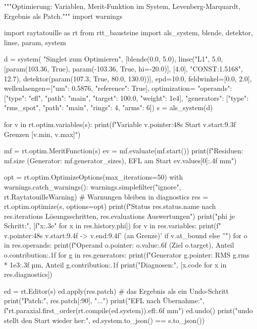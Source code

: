 \documentclass[11pt,a4paper,openany]{book}
\DeclareRobustCommand{\code}[1]{\texttt{\directlua{rttcode("\luaescapestring{\detokenize{#1}}")}}}
\begin{document}
\begin{pycode}[title={\code{ex13_optimierung.py}}]
"""Optimierung: Variablen, Merit-Funktion im System, Levenberg-Marquardt, Ergebnis als Patch."""
import warnings

import raytatouille as rt
from rtt_bausteine import als_system, blende, detektor, linse, param, system

d = system(
    "Singlet zum Optimieren",
    [blende(0.0, 5.0),
     linse("L1", 5.0, [param(103.36, True), param(-103.36, True, hi=-20.0)], [4.0],
           "CONST:1.5168", 12.7),
     detektor(param(107.3, True, 80.0, 130.0))],
    epd=10.0, feldwinkel=[0.0, 2.0], wellenlaengen=[{"um": 0.5876, "reference": True}],
    optimization={
        "operands": [{"type": "efl", "path": "main", "target": 100.0, "weight": 1e4}],
        "generators": [{"type": "rms_spot", "path": "main", "rings": 4, "arms": 6}]})
s = als_system(d)

for v in rt.optim.variables(s):
    print(f"Variable {v.pointer:48s} Start {v.start:9.3f}  Grenzen [{v.min}, {v.max}]")

mf = rt.optim.MeritFunction(s)
ev = mf.evaluate(mf.start())
print(f"Residuen: {mf.size} (Generator: {mf.generator_sizes}), EFL am Start {ev.values[0]:.4f} mm")

opt = rt.optim.OptimizeOptions(max_iterations=50)
with warnings.catch_warnings():
    warnings.simplefilter("ignore", rt.RaytatouilleWarning)   # Warnungen bleiben in diagnostics
    res = rt.optim.optimize(s, options=opt)
print(f"Status {res.status.name} nach {res.iterations} Lösungsschritten, {res.evaluations} Auswertungen")
print("phi je Schritt:", [f"{x:.3e}" for x in res.history.phi])
for v in res.variables:
    print(f"  {v.pointer:48s} {v.start:9.4f} -> {v.end:9.4f}{'  (an Grenze)' if v.at_bound else ''}")
for o in res.operands:
    print(f"Operand {o.pointer}: {o.value:.6f} (Ziel {o.target}), Anteil {o.contribution:.1f} %
for g in res.generators:
    print(f"Generator {g.pointer}: RMS {g.rms * 1e3:.3f} µm, Anteil {g.contribution:.1f} %
print("Diagnosen:", [x.code for x in res.diagnostics])

ed = rt.Editor(s)
ed.apply(res.patch)                     # das Ergebnis als ein Undo-Schritt
print("Patch:", res.patch[:90], "...")
print("EFL nach Übernahme:", f"{rt.paraxial.first_order(rt.compile(ed.system)).efl:.6f} mm")
ed.undo()
print("undo stellt den Start wieder her:", ed.system.to_json() == s.to_json())
\end{pycode}
\end{document}
